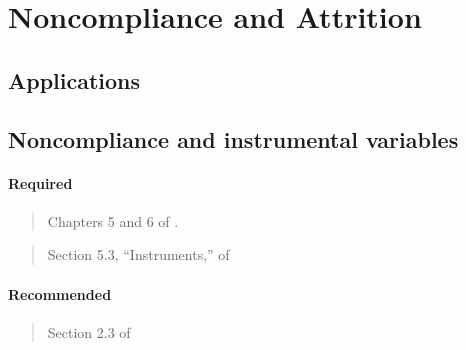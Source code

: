 \documentclass[12pt]{article}
\begin{document}
\begin{verse}  \end{verse}

\begin{verse}  \end{verse}


\section{Noncompliance and Attrition}

\subsection*{Applications}

\begin{verse}  \end{verse}

\subsection{Noncompliance and instrumental variables}

\paragraph*{Required}

\begin{verse} Chapters 5 and 6 of . \end{verse}

\begin{verse}
  Section 5.3, ``Instruments,'' of  \end{verse}

\begin{verse}
 \end{verse}

\paragraph*{Recommended}

\begin{verse} Section 2.3 of  \end{verse}

\begin{verse}  \end{verse}
\end{document}
